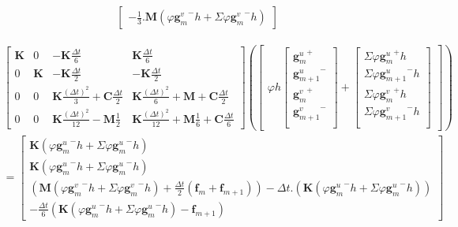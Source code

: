 \documentclass[12pt,a4paper]{report}
\begin{document}
\begin{equation}
\begin{array}{c}
\begin{bmatrix}
			- \frac{1}{3} .  \mathbf{M} (\varphi {\mathbf{g}^v_m}^- h + \Sigma \varphi {\mathbf{g}^v_m}^- h)
	\end{bmatrix}
\end{array}
\end{equation}
 
\begin{equation}
\begin{array}{c}
		\begin{bmatrix}   
		   		\mathbf{K}
			&
		   		0
		   	&
			   	-\mathbf{K} \frac{\Delta t}{6} 
		   	&
		   		\mathbf{K} \frac{\Delta t}{6} 
		\\ 	     
			   0 
			&
				\mathbf{K} 
		   	&
		   		-\mathbf{K} \frac{\Delta t}{2} 
		   	&
		   		-\mathbf{K} \frac{\Delta t}{2}
		\\   
		   		0
		   	& 
		   		0
		   	&
			   	\mathbf{K}
			   		\frac{(\Delta t)^2}{3} 
		   		+\mathbf{C} \frac{\Delta t}{2}
		   	&
		   		\mathbf{K} \frac{(\Delta t)^2}{6} 
		   		+\mathbf{M} 
			   	+\mathbf{C} \frac{\Delta t}{2}
		\\    
		   		0
		   	&
		   		0
		   	&
		   		\mathbf{K} \frac{(\Delta t)^2}{12}
		   		-\mathbf{M}
			   		\frac{1}{2} 
		   	&
		   		\mathbf{K} \frac{(\Delta t)^2}{12}
		   		+\mathbf{M} \frac{1}{6} 
			   +\mathbf{C} \frac{\Delta t}{6} 
	\end{bmatrix}
	\left(
	\begin{bmatrix}
		\varphi h \begin{bmatrix}
		   {\mathbf{g}^u_m}^+  		\\
		   {\mathbf{g}^u_{m+1}}^-  	\\
		   {\mathbf{g}^v_m}^+  		\\
		   {\mathbf{g}^v_{m+1}}^-  	\\
		\end{bmatrix}
		+
		\begin{bmatrix}
		   \Sigma \varphi {\mathbf{g}^u_m}^+ h 		\\
		   \Sigma \varphi {\mathbf{g}^u_{m+1}}^- h  	\\
		   \Sigma \varphi {\mathbf{g}^v_m}^+ h 		\\
		   \Sigma \varphi {\mathbf{g}^v_{m+1}}^- h 	\\
		\end{bmatrix}
	\end{bmatrix}
	\right)
	\\ =
	\begin{bmatrix}	
		  \mathbf{K} (\varphi {\mathbf{g}^u_m}^- h + \Sigma \varphi {\mathbf{g}^u_m}^- h)
		\\ \mathbf{K} (\varphi {\mathbf{g}^u_m}^- h + \Sigma \varphi {\mathbf{g}^u_m}^- h)
		\\ 	\left( \mathbf{M}  (\varphi {\mathbf{g}^v_m}^- h + \Sigma \varphi {\mathbf{g}^v_m}^- h)
		     			+\frac{\Delta t}{2}  (\mathbf{f}_m + \mathbf{f}_{m+1})
			  \right)
			-\Delta t.
			 \left( \mathbf{K}  (\varphi {\mathbf{g}^u_m}^- h + \Sigma \varphi{\mathbf{g}^u_m}^- h)
			  \right)
		\\-\frac{\Delta t}{6}
				\left( \mathbf{K}  (\varphi {\mathbf{g}^u_m}^- h + \Sigma \varphi {\mathbf{g}^u_m}^- h)
						-\mathbf{f}_{m+1}
				\right)
					  

\end{bmatrix}
\end{array}
\end{equation}
\end{document}
